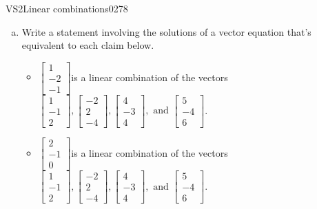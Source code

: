 \begin{exercise}{VS2}{Linear combinations}{0278} 
\begin{exerciseStatement} 

\begin{enumerate}[(a)]
\item  

 Write a statement involving the solutions of a vector equation that's equivalent to each claim below. 

 

\begin{itemize}
\item  

 \(\left[\begin{array}{c}
1 \\
-2 \\
-1
\end{array}\right]\)is a linear combination of the vectors \(\left[\begin{array}{c}
1 \\
-1 \\
2
\end{array}\right] , \left[\begin{array}{c}
-2 \\
2 \\
-4
\end{array}\right] , \left[\begin{array}{c}
4 \\
-3 \\
4
\end{array}\right] , \text{ and } \left[\begin{array}{c}
5 \\
-4 \\
6
\end{array}\right]\). 

 
\item  

 \(\left[\begin{array}{c}
2 \\
-1 \\
0
\end{array}\right]\)is a linear combination of the vectors \(\left[\begin{array}{c}
1 \\
-1 \\
2
\end{array}\right] , \left[\begin{array}{c}
-2 \\
2 \\
-4
\end{array}\right] , \left[\begin{array}{c}
4 \\
-3 \\
4
\end{array}\right] , \text{ and } \left[\begin{array}{c}
5 \\
-4 \\
6
\end{array}\right]\). 


\end{itemize}
\end{enumerate}
\end{exerciseStatement}
\end{exercise}
